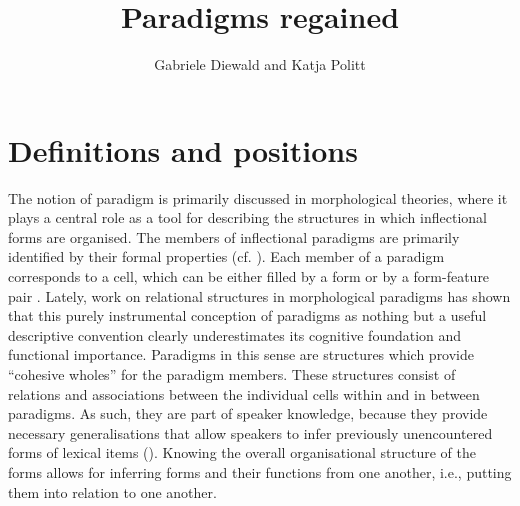 \documentclass[output=paper]{langsci/langscibook}
\author{Gabriele Diewald\affiliation{Leibniz Universität Hannover} and {Katja Politt}\affiliation{{Leibniz Universität Hannover}}}
\title{Paradigms regained}
\begin{document}
\maketitle

\section*{Definitions and positions}

The notion of paradigm is primarily discussed in morphological theories, where it plays a central role as a tool for describing the structures in which inflectional forms are organised. The members of inflectional paradigms are primarily identified by their formal properties (cf. \citealt[7]{Fabri1998}). Each member of a paradigm corresponds to a cell, which can be either filled by a form or by a form-feature pair \citep{Lieb2005,Werner1994,Wurzel1984}. Lately, work on relational structures in morphological paradigms \citep{AckermanEtAl2009,Blevins2015,Blevins2016} has shown that this purely instrumental conception of paradigms as nothing but a useful descriptive convention clearly underestimates its cognitive foundation and functional importance. Paradigms in this sense are structures which provide “cohesive wholes” \citep[94]{Blevins2015} for the paradigm members. These structures consist of relations and associations between the individual cells within and in between paradigms. As such, they are part of speaker knowledge, because they provide necessary generalisations that allow speakers to infer previously unencountered forms of lexical items (\citealt[54]{AckermanEtAl2009}). Knowing the overall organisational structure of the forms allows for inferring forms and their functions from one another, i.e., putting them into relation to one another. 
\end{document}
